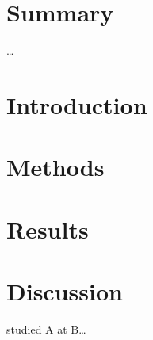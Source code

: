 \documentclass[12pt,a4paper]{article}
\begin{document}
\section*{Summary}
\ldots


\newpage
\thispagestyle{empty}
\tableofcontents


\newpage
\setcounter{page}{1}

\section{Introduction}

\section{Methods}

\section{Results}

\section{Discussion}



%
%




\noindent
 studied A at B\ldots
\end{document}
